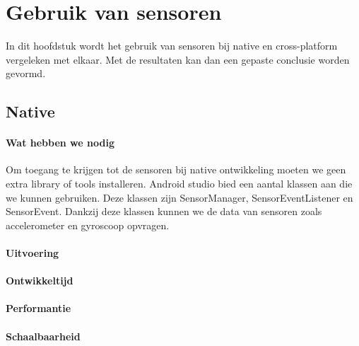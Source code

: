 
\chapter{Gebruik van sensoren}%
\label{ch:sensoren}

In dit hoofdstuk wordt het gebruik van sensoren bij native en cross-platform vergeleken met elkaar. 
Met de resultaten kan dan een gepaste conclusie worden gevormd.

\section{Native}
\subsubsection{Wat hebben we nodig}
Om toegang te krijgen tot de sensoren bij native ontwikkeling moeten we geen extra library of tools installeren.
Android studio bied een aantal klassen aan die we kunnen gebruiken. Deze klassen zijn SensorManager, 
SensorEventListener en SensorEvent. Dankzij deze klassen kunnen we de data van sensoren zoals accelerometer en 
gyroscoop opvragen.

\subsubsection{Uitvoering}



\subsubsection{Ontwikkeltijd}



\subsubsection{Performantie}



\subsubsection{Schaalbaarheid}

